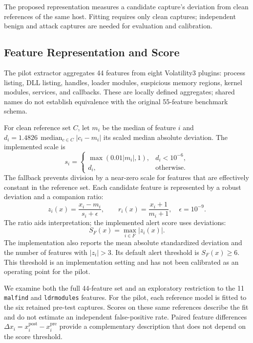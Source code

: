 \documentclass[conference]{IEEEtran}
\begin{document}
The proposed representation measures a candidate capture's deviation from clean
references of the same host. Fitting requires only clean captures; independent
benign and attack captures are needed for evaluation and calibration.

\subsection{Feature Representation and Score}
The pilot extractor aggregates 44 features from eight Volatility3 plugins:
process listing, DLL listing, handles, loader modules, suspicious memory
regions, kernel modules, services, and callbacks. These are locally defined
aggregates; shared names do not establish equivalence with the original
55-feature benchmark schema.

For clean reference set $C$, let $m_i$ be the median of feature $i$ and
$d_i=1.4826\,\operatorname{median}_{c\in C}|c_i-m_i|$ its scaled median
absolute deviation. The implemented scale is
\begin{equation}
s_i=\begin{cases}
\max(0.01|m_i|,1), & d_i<10^{-6},\\
d_i, & \text{otherwise}.
\end{cases}
\end{equation}
The fallback prevents division by a near-zero scale for features that are
effectively constant in the reference set. Each candidate feature is represented
by a robust deviation and a companion ratio:
\begin{equation}
z_i(x)=\frac{x_i-m_i}{s_i+\epsilon},\qquad
r_i(x)=\frac{x_i+1}{m_i+1},\quad \epsilon=10^{-9}.
\end{equation}
The ratio aids interpretation; the implemented alert score uses deviations:
\begin{equation}
S_F(x)=\max_{i\in F}|z_i(x)|.
\label{eq:score}
\end{equation}
The implementation also reports the mean absolute standardized deviation and the number of
features with $|z_i|>3$. Its default alert threshold is $S_F(x)\geq6$.
This threshold is an implementation setting and has not been calibrated as an
operating point for the pilot.

We examine both the full 44-feature set and an exploratory restriction to the
11 \texttt{malfind} and \texttt{ldrmodules} features. For the pilot, each
reference model is fitted to the six retained pre-test captures. Scores on
these same references describe the fit and do not estimate an independent
false-positive rate. Paired feature differences
$\Delta x_i=x_i^{\mathrm{post}}-x_i^{\mathrm{pre}}$ provide a complementary
description that does not depend on the score threshold.
\end{document}
